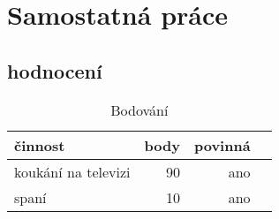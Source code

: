 \documentclass{article}
\begin{document}
\section{Samostatná práce}
\subsection{hodnocení}
\begin{table}\centering
\caption{Bodování} \label{pic:a}
\begin{tabular}{p{3cm}||rr|c}

činnost &body &povinná  \\ \hline \hline
koukání na televizi & 90 & ano \\ \hline
spaní & 10 & ano 


\end{tabular}

\end{table}
\end{document}
